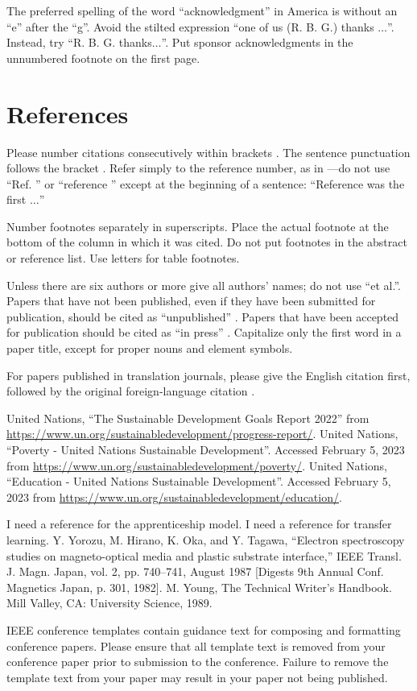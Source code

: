 \documentclass[conference]{IEEEtran}
\begin{document}
The preferred spelling of the word ``acknowledgment'' in America is without 
an ``e'' after the ``g''. Avoid the stilted expression ``one of us (R. B. 
G.) thanks $\ldots$''. Instead, try ``R. B. G. thanks$\ldots$''. Put sponsor 
acknowledgments in the unnumbered footnote on the first page.

\section*{References}

Please number citations consecutively within brackets \cite{b1}. The 
sentence punctuation follows the bracket \cite{b2}. Refer simply to the reference 
number, as in \cite{b3}---do not use ``Ref. \cite{b3}'' or ``reference \cite{b3}'' except at 
the beginning of a sentence: ``Reference \cite{b3} was the first $\ldots$''

Number footnotes separately in superscripts. Place the actual footnote at 
the bottom of the column in which it was cited. Do not put footnotes in the 
abstract or reference list. Use letters for table footnotes.

Unless there are six authors or more give all authors' names; do not use 
``et al.''. Papers that have not been published, even if they have been 
submitted for publication, should be cited as ``unpublished'' \cite{b4}. Papers 
that have been accepted for publication should be cited as ``in press'' \cite{b5}. 
Capitalize only the first word in a paper title, except for proper nouns and 
element symbols.

For papers published in translation journals, please give the English 
citation first, followed by the original foreign-language citation \cite{b6}.

\begin{thebibliography}{00}
   United Nations, ``The Sustainable Development Goals Report 2022'' from \url{https://www.un.org/sustainabledevelopment/progress-report/}.
   United Nations, ``Poverty - United Nations Sustainable Development''. Accessed February 5, 2023 from \url{https://www.un.org/sustainabledevelopment/poverty/}.
   United Nations, ``Education - United Nations Sustainable Development''. Accessed February 5, 2023 from \url{https://www.un.org/sustainabledevelopment/education/}.

  
 I need a reference for the apprenticeship model.
 I need a reference for transfer learning.
 Y. Yorozu, M. Hirano, K. Oka, and Y. Tagawa, ``Electron spectroscopy studies on magneto-optical media and plastic substrate interface,'' IEEE Transl. J. Magn. Japan, vol. 2, pp. 740--741, August 1987 [Digests 9th Annual Conf. Magnetics Japan, p. 301, 1982].
 M. Young, The Technical Writer's Handbook. Mill Valley, CA: University Science, 1989.
\end{thebibliography}
\vspace{12pt}
\color{red}
IEEE conference templates contain guidance text for composing and formatting conference papers. Please ensure that all template text is removed from your conference paper prior to submission to the conference. Failure to remove the template text from your paper may result in your paper not being published.
\end{document}
